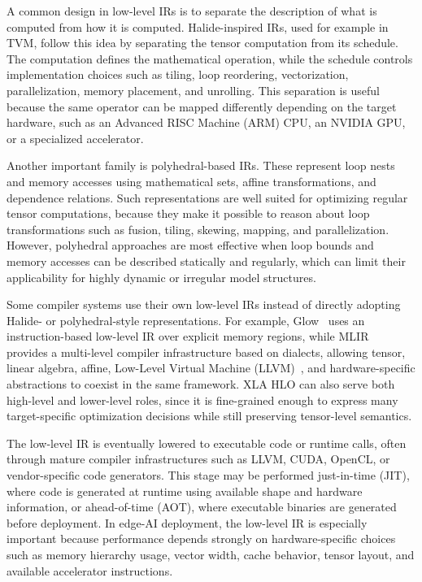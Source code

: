 \documentclass[12pt,a4paper]{report}
\begin{document}
A common design in low-level IRs is to separate the description of what is computed from
how it is computed. Halide-inspired IRs, used for example in TVM, follow this idea by
separating the tensor computation from its schedule. The computation defines the mathematical
operation, while the schedule controls implementation choices such as tiling, loop reordering,
vectorization, parallelization, memory placement, and unrolling. This separation is useful because
the same operator can be mapped differently depending on the target hardware, such as an Advanced RISC Machine (ARM)
CPU, an NVIDIA GPU, or a specialized accelerator.

Another important family is polyhedral-based IRs. These represent loop nests and memory
accesses using mathematical sets, affine transformations, and dependence relations. Such
representations are well suited for optimizing regular tensor computations, because they make it
possible to reason about loop transformations such as fusion, tiling, skewing, mapping, and
parallelization. However, polyhedral approaches are most effective when loop bounds and memory
accesses can be described statically and regularly, which can limit their applicability for highly
dynamic or irregular model structures.

Some compiler systems use their own low-level IRs instead of directly adopting Halide- or
polyhedral-style representations. For example, Glow~\cite{rotem2018glow} uses an instruction-based low-level IR over
explicit memory regions, while MLIR~\cite{mlir_overview} provides a multi-level compiler infrastructure based on
dialects, allowing tensor, linear algebra, affine, Low-Level Virtual Machine (LLVM)~\cite{lattner2004llvm}, and hardware-specific
abstractions to coexist in the same framework.
XLA HLO can also serve both high-level and lower-level roles, since it is
fine-grained enough to express many target-specific optimization decisions while still preserving
tensor-level semantics.

The low-level IR is eventually lowered to executable code or runtime calls, often through mature
compiler infrastructures such as LLVM, CUDA, OpenCL, or vendor-specific code generators. This
stage may be performed just-in-time (JIT), where code is generated at runtime using available
shape and hardware information, or ahead-of-time (AOT), where executable binaries are generated
before deployment. In edge-AI deployment, the low-level IR is especially important because
performance depends strongly on hardware-specific choices such as memory hierarchy usage,
vector width, cache behavior, tensor layout, and available accelerator instructions.
\end{document}
